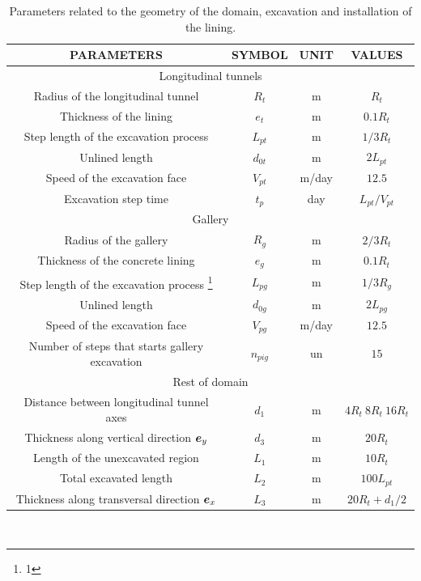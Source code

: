 \documentclass[Journal,letterpaper, NoLists,SectionNumbers]{ascelike-new}
\begin{document}
\begin{table}
	\caption{Parameters related to the geometry of the domain, excavation and installation of the lining.}
	\label{table1}
	\centering
	\renewcommand{\arraystretch}{1.25}
	\begin{tabular}{c c c c}
		\hline
		\multicolumn{1}{c}{PARAMETERS} &
		\multicolumn{1}{c}{SYMBOL} &
		\multicolumn{1}{c}{UNIT} &
		\multicolumn{1}{c}{VALUES} \\
		\hline
		\multicolumn{4}{c}{Longitudinal tunnels} \\
		\hline
		Radius of the longitudinal tunnel & $R_t$ & m & $R_t$ \\
		Thickness of the lining & $e_t$ & m & $0.1R_t$ \\
		Step length of the excavation process & $L_{pt}$ & m & $1/3R_t$ \\
		Unlined length & $d_{0t}$ & m & $2L_{pt}$ \\
		Speed of the excavation face & $V_{pt}$ & m/day & $12.5$ \\
		Excavation step time & $t_p$ & day & $L_{pt}/V_{pt}$ \\
		\hline
		\multicolumn{4}{c}{Gallery} \\
		\hline
		Radius of the gallery & $R_{g}$ & m & $2/3R_t$ \\
		Thickness of the concrete lining & $e_g$ & m & $0.1R_t$ \\
		Step length of the excavation process \footnote{1} & $L_{pg}$ & m & $1/3R_g$ \\
		Unlined length & $d_{0g}$ & m & $2L_{pg}$ \\
		Speed of the excavation face & $V_{pg}$ & m/day & $12.5$ \\
		Number of steps that starts gallery excavation & $n_{pig}$ & un & $15$ \\
		\hline
		\multicolumn{4}{c}{Rest of domain} \\
		\hline
		Distance between longitudinal tunnel axes & $d_1$ & m & $4R_t ~8R_t ~16R_t$ \\
		Thickness along vertical direction $\boldsymbol{e}_y$ & $d_3$ & m & $20R_t$ \\
		Length of the unexcavated region & $L_1$ & m & $10R_t$ \\
		Total excavated length & $L_2$ & m & $100L_{pt}$ \\
		Thickness along transversal direction $\boldsymbol{e}_x$ & $L_3$ & m & $20R_t + d_1/2$ \\
		\hline
	\end{tabular}
	\normalsize
	\\ 
\end{table}
\end{document}
